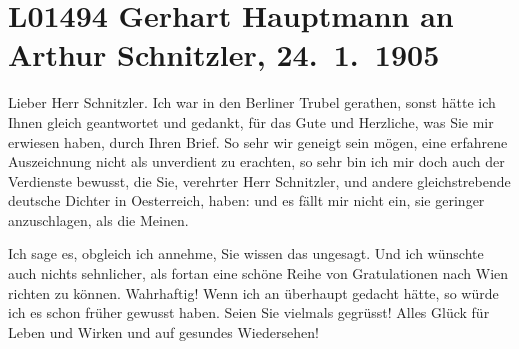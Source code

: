

\section[Gerhart Hauptmann an Arthur Schnitzler, 24. 1. 1905]{L01494 Gerhart Hauptmann an Arthur Schnitzler, 24. 1. 1905}
\nopagebreak{}
\rehead{ }\normalsize\beginnumbering{}
\toendnotes[C]{\smallbreak\pagebreak[2]}
\toendnotes[C]{\smallbreak}
\pstart{}{\pb}Lieber Herr Schnitzler.\pend\vspace{0.5em}
\pstart
           Ich war in den Berliner Trubel gerathen, sonst
               hätte ich Ihnen gleich geantwortet und gedankt, für das Gute und Herzliche, was Sie
               mir erwiesen haben, durch Ihren Brief. So sehr wir geneigt sein mögen, eine erfahrene
               Auszeichnung nicht als unverdient zu erachten, so sehr bin ich mir doch auch der
               Verdienste bewusst, die Sie, verehrter Herr Schnitzler, und andere gleichstrebende
               deutsche Dichter in Oesterreich, haben: und es
               fällt mir nicht ein, sie geringer anzuschlagen, als die Meinen.\pend
           
\pstart
           Ich sage es, obgleich ich {\pb}annehme, Sie
               wissen das ungesagt. Und ich wünschte auch nichts sehnlicher, als fortan eine schöne
               Reihe von Gratulationen nach Wien richten zu
               können. Wahrhaftig! Wenn ich an \label{K_L01494-1v}\label{K_L01494-1}
               überhaupt gedacht hätte, so würde ich es schon früher gewusst haben. Seien Sie
               vielmals gegrüsst! Alles Glück für Leben und Wirken und auf gesundes Wiedersehen!\pend
           

